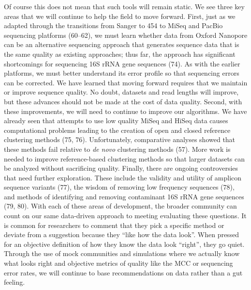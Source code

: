 \documentclass[11pt,]{article}
\begin{document}
Of course this does not mean that such tools will remain static. We see
three key areas that we will continue to help the field to move forward.
First, just as we adapted through the transitions from Sanger to 454 to
MiSeq and PacBio sequencing platforms (60--62), we must learn whether
data from Oxford Nanopore can be an alternative sequencing approach that
generates sequence data that is the same quality as existing approaches;
thus far, the approach has significant shortcomings for sequencing 16S
rRNA gene sequences (74). As with the earlier platforms, we must better
understand its error profile so that sequencing errors can be corrected.
We have learned that moving forward requires that we maintain or improve
sequence quality. No doubt, datasets and read lengths will improve, but
these advances should not be made at the cost of data quality. Second,
with these improvements, we will need to continue to improve our
algorithms. We have already seen that attempts to use low quality MiSeq
and HiSeq data causes computational problems leading to the creation of
open and closed reference clustering methods (75, 76). Unfortunately,
comparative analyses showed that these methods fail relative to \emph{de
novo} clustering methods (57). More work is needed to improve
reference-based clustering methods so that larger datasets can be
analyzed without sacrificing quality. Finally, there are ongoing
controversies that need further exploration. These include the validity
and utility of amplicon sequence variants (77), the wisdom of removing
low frequency sequences (78), and methods of identifying and removing
contaminant 16S rRNA gene sequences (79, 80). With each of these areas
of development, the broader community can count on our same data-driven
approach to meeting evaluating these questions. It is common for
researchers to comment that they pick a specific method or deviate from
a suggestion because they ``like how the data look''. When pressed for
an objective definition of how they know the data look ``right'', they
go quiet. Through the use of mock communities and simulations where we
actually know what looks right and objective metrics of quality like the
MCC or sequencing error rates, we will continue to base recommendations
on data rather than a gut feeling.
\end{document}
